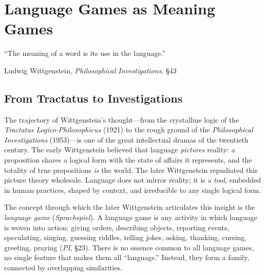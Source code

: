

\chapter{Language Games as Meaning Games}
\label{ch:language-games}

\epigraph{``The meaning of a word is its use in the language.''}{Ludwig Wittgenstein, \textit{Philosophical Investigations}, \S43}

\section{From Tractatus to Investigations}

The trajectory of Wittgenstein's thought---from the crystalline logic of the
\textit{Tractatus Logico-Philosophicus} (1921) to the rough ground of the
\textit{Philosophical Investigations} (1953)---is one of the great
intellectual dramas of the twentieth century. The early Wittgenstein believed
that language \emph{pictures} reality: a proposition shares a logical form
with the state of affairs it represents, and the totality of true propositions
\emph{is} the world. The later Wittgenstein repudiated this picture theory
wholesale. Language does not mirror reality; it is a \emph{tool}, embedded in
human practices, shaped by context, and irreducible to any single logical form.

The concept through which the later Wittgenstein articulates this insight is the
\emph{language game} (\textit{Sprachspiel}). A language game is any activity
in which language is woven into action: giving orders, describing objects,
reporting events, speculating, singing, guessing riddles, telling jokes, asking,
thanking, cursing, greeting, praying (\textit{PI}, \S23). There is no essence
common to all language games, no single feature that makes them all ``language.''
Instead, they form a family, connected by overlapping similarities.

